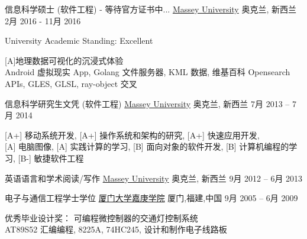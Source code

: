 
\begin{cventries}
\cventry
{信息科学硕士 (软件工程) - 等待官方证书中...}
{\href{http://www.massey.ac.nz/}{Massey University}}
{奥克兰, \enskip 新西兰}
{2月 2016 - 11月 2016}
{
	\begin{cvitems}
		\item{University Academic Standing: Excellent}
		\item {[A]地理数据可视化的沉浸式体验\\
			Android 虚拟现实 App, Golang 文件服务器, KML 数据, 维基百科 Opensearch APIs, GLES, GLSL, ray-object 交叉}
	\end{cvitems}
}
\end{cventries}

\begin{cventries}
	\cventry
	{信息科学研究生文凭 (软件工程)}
	{\href{http://www.massey.ac.nz/}{Massey University}}
	{奥克兰, \enskip 新西兰}
	{7月 2013 – 7月 2014}
	{
		\begin{cvitems}
			\item{[A+] 移动系统开发},\enskip
			{[A+] 操作系统和架构的研究},\enskip
			{[A+] 快速应用开发},\enskip\\
			{[A] 电脑图像},\enskip
			{[A] 实践计算的学习},\enskip
			{[B] 面向对象的软件开发},\enskip
			{[B] 计算机编程的学习},\enskip
			{[B-] 敏捷软件工程}\enskip
		\end{cvitems}
	}
\end{cventries}

\begin{cventries}
	\cventry
	{英语语言和学术阅读/写作}
	{\href{http://www.massey.ac.nz/}{Massey University}}
	{奥克兰, \enskip 新西兰}
	{9月 2012 – 6月 2013}
	{
		\begin{cvitems}
		\end{cvitems}
	}
\end{cventries}

\begin{cventries}
	\cventry
	{电子与通信工程学士学位}
	{\href{http://www.xmu.edu.cn/en/}{厦门大学嘉庚学院}}
	{厦门,\enskip 福建,\enskip 中国}
	{9月 2005 – 6月 2009}
	{
		\begin{cvitems}
			\item {优秀毕业设计奖： 可编程微控制器的交通灯控制系统\\
			AT89S52 汇编编程, 8225A, 74HC245, 设计和制作电子线路板}
		\end{cvitems}
	}
\end{cventries}

